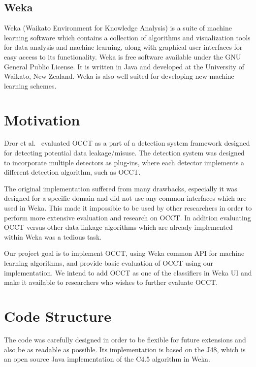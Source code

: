 \documentclass[a4paper,12pt]{article}
\begin{document}
\begin{spacing}{1.5}
\subsection{Weka}
Weka (Waikato Environment for Knowledge Analysis) is a suite of machine learning software
which contains a collection of algorithms and visualization tools for data analysis and machine
learning, along with graphical user interfaces for easy access to its functionality. Weka is
free software available under the GNU General Public License.
It is written in Java and developed at the University of Waikato, New Zealand. Weka is also well-suited
for developing new machine learning schemes.

\section{Motivation}
Dror et al.~\cite{dror2011thesis,dror2014occt} evaluated OCCT as a part of a detection system framework
designed for detecting potential data leakage/misuse. The detection system was
designed to incorporate multiple detectors as plug-ins, where each detector implements a
different detection algorithm, such as OCCT.

The original implementation suffered from many drawbacks, especially it was designed for a
specific domain and did not use any common interfaces which are used in Weka. This made it impossible to
be used by other researchers in order to perform more extensive evaluation and research on OCCT.
In addition evaluating OCCT versus other data linkage algorithms which are already implemented within Weka
was a tedious task.

Our project goal is to implement OCCT, using Weka common API for machine learning
algorithms, and provide basic evaluation of OCCT using our implementation. We intend to add
OCCT as one of the classifiers in Weka UI and make it available to researchers who wishes to further
evaluate OCCT.

\section{Code Structure}
The code was carefully designed in order to be flexible for future extensions and also be as readable as possible. Its implementation is based on the J48, which is an open source Java implementation of the C4.5 algorithm in Weka.


\end{spacing}
\end{document}

